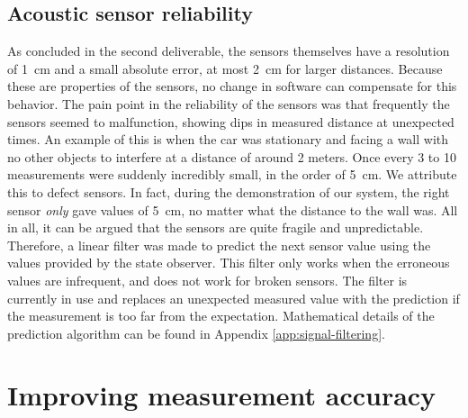 \documentclass[11pt,titlepage]{report}
\begin{document}
\subsection{Acoustic sensor reliability}
As concluded in the second deliverable, the sensors themselves have a resolution of \SI{1}{cm} and a small absolute error, at most \SI{2}{cm} for larger distances. Because these are properties of the sensors, no change in software can compensate for this behavior. The pain point  in the reliability of the sensors was that frequently the sensors seemed to malfunction, showing dips in measured distance at unexpected times. An example of this is when the car was stationary and facing a wall with no other objects to interfere at a distance of around 2 meters. Once every 3 to 10 measurements were suddenly incredibly small, in the order of \SI{5}{cm}. We attribute this to defect sensors. In fact, during the demonstration of our system, the right sensor \textit{only} gave values of \SI{5}{cm}, no matter what the distance to the wall was. All in all, it can be argued that the sensors are quite fragile and unpredictable. Therefore, a linear filter was made to predict the next sensor value using the values provided by the state observer. This filter only works when the erroneous values are infrequent, and does not work for broken sensors. The filter is currently in use and replaces an unexpected measured value with the prediction if the measurement is too far from the expectation. Mathematical details of the prediction algorithm can be found in Appendix \ref{app:signal-filtering}.

\section{Improving measurement accuracy}
\end{document}
